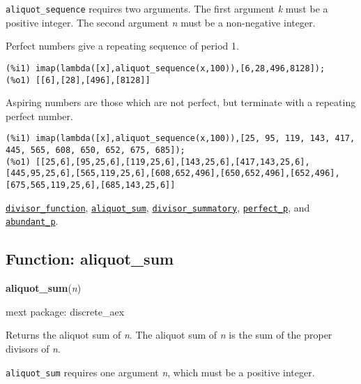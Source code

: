 \documentclass[]{article}
\begin{document}
   {\tt aliquot\_sequence} requires two arguments.
    The first argument {\it k} must be a positive integer.
    The second argument {\it n} must be a non-negative integer.


\vspace{5 pt}


   Perfect numbers give a repeating sequence of period 1. 

\begin{Verbatim}[frame=single]
(%i1) imap(lambda([x],aliquot_sequence(x,100)),[6,28,496,8128]);
(%o1) [[6],[28],[496],[8128]]
\end{Verbatim}

   Aspiring numbers are those which are not perfect, but terminate with a 
   repeating perfect number. 

\begin{Verbatim}[frame=single]
(%i1) imap(lambda([x],aliquot_sequence(x,100)),[25, 95, 119, 143, 417, 445, 565, 608, 650, 652, 675, 685]);
(%o1) [[25,6],[95,25,6],[119,25,6],[143,25,6],[417,143,25,6],[445,95,25,6],[565,119,25,6],[608,652,496],[650,652,496],[652,496],[675,565,119,25,6],[685,143,25,6]]
\end{Verbatim}


  \hyperlink{divisor_function}{{\tt divisor\_function}}, \hyperlink{aliquot_sum}{{\tt aliquot\_sum}}, \hyperlink{divisor_summatory}{{\tt divisor\_summatory}}, \hyperlink{perfect_p}{{\tt perfect\_p}}, and \hyperlink{abundant_p}{{\tt abundant\_p}}.

\vspace{5 pt}


\subsection{Function: aliquot\_sum\label{sec:aliquot_sum}}
\hypertarget{aliquot_sum}{}
{\bf aliquot\_sum}({\it n})


\noindent mext package: discrete\_aex



\vspace{5 pt}
Returns the aliquot sum of {\it n}. The aliquot sum of {\it n} is the sum of the proper divisors of {\it n}. 

\vspace{5 pt}

   {\tt aliquot\_sum} requires one argument {\it n}, which must be a positive integer.
\end{document}
